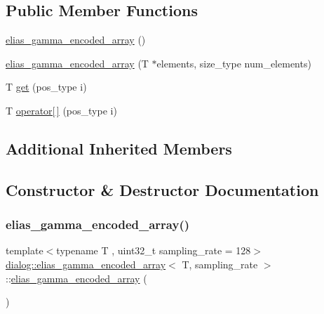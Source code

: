 \subsection*{Public Member Functions}
\begin{DoxyCompactItemize}
\item 
\hyperlink{classdialog_1_1elias__gamma__encoded__array_a18b53f9744c7c0c0a1d0e5a77ffcb840}{elias\+\_\+gamma\+\_\+encoded\+\_\+array} ()
\item 
\hyperlink{classdialog_1_1elias__gamma__encoded__array_a65bed69251739947eabd7e0a157b8923}{elias\+\_\+gamma\+\_\+encoded\+\_\+array} (T $\ast$elements, size\+\_\+type num\+\_\+elements)
\item 
T \hyperlink{classdialog_1_1elias__gamma__encoded__array_a34a2e347fc7b8c7091590a457954522c}{get} (pos\+\_\+type i)
\item 
T \hyperlink{classdialog_1_1elias__gamma__encoded__array_ab9a186f942d1ce70c7a03b5b5a97fdbc}{operator\mbox{[}$\,$\mbox{]}} (pos\+\_\+type i)
\end{DoxyCompactItemize}
\subsection*{Additional Inherited Members}


\subsection{Constructor \& Destructor Documentation}
\mbox{\label{classdialog_1_1elias__gamma__encoded__array_a18b53f9744c7c0c0a1d0e5a77ffcb840}} 
\subsubsection{\texorpdfstring{elias\+\_\+gamma\+\_\+encoded\+\_\+array()}{elias\_gamma\_encoded\_array()}\hspace{0.1cm}{\footnotesize\ttfamily [1/2]}}
{\footnotesize\ttfamily template$<$typename T , uint32\+\_\+t sampling\+\_\+rate = 128$>$ \\
\hyperlink{classdialog_1_1elias__gamma__encoded__array}{dialog\+::elias\+\_\+gamma\+\_\+encoded\+\_\+array}$<$ T, sampling\+\_\+rate $>$\+::\hyperlink{classdialog_1_1elias__gamma__encoded__array}{elias\+\_\+gamma\+\_\+encoded\+\_\+array} (\begin{DoxyParamCaption}{ }\end{DoxyParamCaption})\hspace{0.3cm}{\ttfamily [inline]}}

